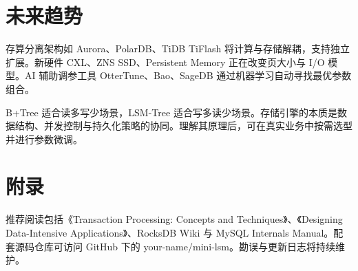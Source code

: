 \chapter{未来趋势}
存算分离架构如 Aurora、PolarDB、TiDB TiFlash 将计算与存储解耦，支持独立扩展。新硬件 CXL、ZNS SSD、Persistent Memory 正在改变页大小与 I/O 模型。AI 辅助调参工具 OtterTune、Bao、SageDB 通过机器学习自动寻找最优参数组合。\par
B+Tree 适合读多写少场景，LSM-Tree 适合写多读少场景。存储引擎的本质是数据结构、并发控制与持久化策略的协同。理解其原理后，可在真实业务中按需选型并进行参数微调。\par
\chapter{附录}
推荐阅读包括《Transaction Processing: Concepts and Techniques》、《Designing Data-Intensive Applications》、RocksDB Wiki 与 MySQL Internals Manual。配套源码仓库可访问 GitHub 下的 your-name/mini-lsm。勘误与更新日志将持续维护。\par

